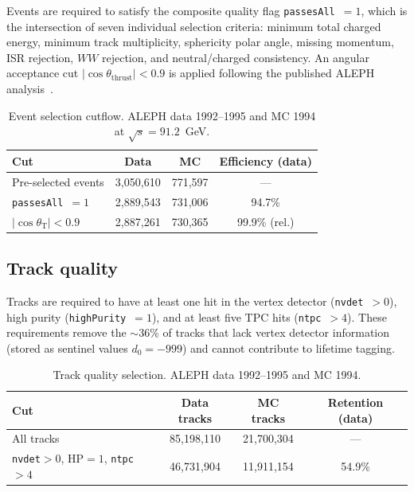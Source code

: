 \documentclass[11pt,a4paper]{article}
\begin{document}
Events are required to satisfy the composite quality flag
\texttt{passesAll}~$= 1$, which is the intersection of seven individual
selection criteria: minimum total charged energy, minimum track
multiplicity, sphericity polar angle, missing momentum, ISR rejection,
$WW$ rejection, and neutral/charged consistency.  An angular acceptance
cut $|\cos\theta_\mathrm{thrust}| < 0.9$ is applied following the
published ALEPH analysis~\cite{ALEPH:AFBb}.

\begin{table}[htbp]
\centering
\caption{Event selection cutflow.  ALEPH data 1992--1995 and MC 1994
  at $\sqrt{s} = 91.2$~GeV.}
\label{tbl:cutflow}
\begin{tabular}{lccc}
\toprule
Cut & Data & MC & Efficiency (data) \\
\midrule
Pre-selected events         & 3,050,610 & 771,597 & ---     \\
\texttt{passesAll}~$= 1$   & 2,889,543 & 731,006 & 94.7\%  \\
$|\cos\theta_\mathrm{T}| < 0.9$ & 2,887,261 & 730,365 & 99.9\% (rel.) \\
\bottomrule
\end{tabular}
\end{table}

\subsection{Track quality}

Tracks are required to have at least one hit in the vertex detector
(\texttt{nvdet}~$> 0$), high purity (\texttt{highPurity}~$= 1$), and
at least five TPC hits (\texttt{ntpc}~$> 4$).  These requirements
remove the $\sim$36\% of tracks that lack vertex detector information
(stored as sentinel values $d_0 = -999$) and cannot contribute to
lifetime tagging.

\begin{table}[htbp]
\centering
\caption{Track quality selection.  ALEPH data 1992--1995 and MC 1994.}
\label{tbl:tracksel}
\begin{tabular}{lccc}
\toprule
Cut & Data tracks & MC tracks & Retention (data) \\
\midrule
All tracks                            & 85,198,110 & 21,700,304 & ---    \\
\texttt{nvdet}$>0$, HP$=1$, \texttt{ntpc}$>4$ & 46,731,904 & 11,911,154 & 54.9\% \\
\bottomrule
\end{tabular}
\end{table}
\end{document}
